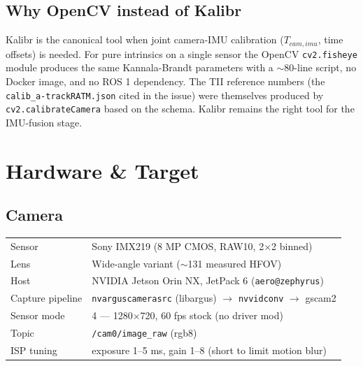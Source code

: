\documentclass[11pt,a4paper]{article}
\begin{document}
\subsection{Why OpenCV instead of Kalibr}

Kalibr is the canonical tool when joint camera-IMU calibration ($T_{cam,imu}$, time offsets) is needed. For pure intrinsics on a single sensor the OpenCV \texttt{cv2.fisheye} module produces the same Kannala-Brandt parameters with a $\sim$80-line script, no Docker image, and no ROS 1 dependency. The TII reference numbers (the \texttt{calib\_a-trackRATM.json} cited in the issue) were themselves produced by \texttt{cv2.calibrateCamera} based on the schema. Kalibr remains the right tool for the IMU-fusion stage.

\clearpage

\section{Hardware \& Target}

\subsection{Camera}

\begin{center}
\renewcommand{\arraystretch}{1.25}
\begin{tabular}{@{}>{\sffamily\color{ethMuted}}l l@{}}
\toprule
Sensor                & Sony IMX219 (8 MP CMOS, RAW10, 2$\times$2 binned)\\
Lens                  & Wide-angle variant ($\sim$131\textdegree{} measured HFOV)\\
Host                  & NVIDIA Jetson Orin NX, JetPack 6 (\texttt{aero@zephyrus})\\
Capture pipeline      & \texttt{nvarguscamerasrc} (libargus) $\rightarrow$ \texttt{nvvidconv} $\rightarrow$ gscam2\\
Sensor mode           & 4 — 1280$\times$720, 60 fps stock (no driver mod)\\
Topic                 & \texttt{/cam0/image\_raw} (rgb8)\\
ISP tuning            & exposure 1--5 ms, gain 1--8 (short to limit motion blur)\\
\bottomrule
\end{tabular}
\end{center}
\end{document}
